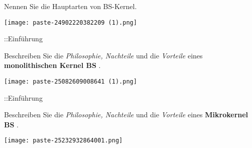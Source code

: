 \documentclass{article}
\begin{document}
\begin{tcolorbox}[colback=white!10!white,colframe=lightgray!75!black,
  savelowerto=\jobname_ex.tex]

\begin{center}
Nennen Sie die Hauptarten von BS-Kernel.

\end{center}

\tcblower

\justifying
\texttt{[image: paste-24902220382209 (1).png]}

\end{tcolorbox}
\begin{tcolorbox}[colback=white!10!white,colframe=lightgray!75!black,
  savelowerto=\jobname_ex.tex]

\begin{center}
::Einführung

\end{center}

\tcblower

\justifying

\end{tcolorbox}
\begin{tcolorbox}[colback=white!10!white,colframe=lightgray!75!black,
  savelowerto=\jobname_ex.tex]

\begin{center}
Beschreiben Sie die 
\textit{Philosophie, Nachteile
}und die 
\textit{Vorteile
}eines 
\textbf{monolithischen Kernel BS
}.

\end{center}

\tcblower

\justifying
\texttt{[image: paste-25082609008641 (1).png]}

\end{tcolorbox}
\begin{tcolorbox}[colback=white!10!white,colframe=lightgray!75!black,
  savelowerto=\jobname_ex.tex]

\begin{center}
::Einführung

\end{center}

\tcblower

\justifying

\end{tcolorbox}
\begin{tcolorbox}[colback=white!10!white,colframe=lightgray!75!black,
  savelowerto=\jobname_ex.tex]

\begin{center}
Beschreiben Sie die
\textit{Philosophie, Nachteile
}und die
\textit{Vorteile
}eines
\textbf{Mikrokernel BS
}.

\end{center}

\tcblower

\justifying
\texttt{[image: paste-25232932864001.png]}

\end{tcolorbox}
\end{document}
